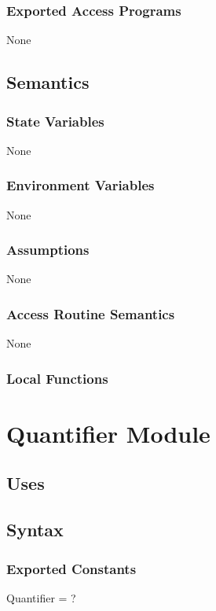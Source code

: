 \documentclass[12pt, titlepage]{article}
\begin{document}
\subsubsection{Exported Access Programs}

None

\subsection{Semantics}
\subsubsection{State Variables}
None

\subsubsection{Environment Variables}
None

\subsubsection{Assumptions}
None

\subsubsection{Access Routine Semantics}

None

\subsubsection{Local Functions}


\newpage

\section{Quantifier Module}

\subsection{Uses}

\subsection{Syntax}

\subsubsection{Exported Constants}
Quantifier = ?
\end{document}
